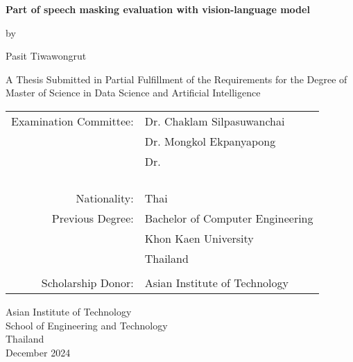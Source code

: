 \begin{titlepage}
  \begin{center}
   
  \textbf{\large{ Part of speech masking evaluation with vision-language model }}

  \vspace{3em} %
  
  by
  
  \vspace{3em} %
  
  Pasit Tiwawongrut
  
  \vspace{4em} %

  A Thesis Submitted in Partial Fulfillment of the Requirements for the Degree of Master of Science in Data Science and Artificial Intelligence

  \vspace{4em} %

\begin{center}
  \begin{tabular}{ rl }
Examination Committee: & Dr. Chaklam Silpasuwanchai \\
                       & Dr. Mongkol Ekpanyapong \\
                       & Dr.  \\\\
                       
\\ \\ \\
Nationality:     & Thai \\
Previous Degree: & Bachelor of Computer Engineering \\
                 & Khon Kaen University \\
                 & Thailand \\
\\
Scholarship Donor: & Asian Institute of Technology
  \end{tabular}
\end{center}

\vspace{3em}

Asian Institute of Technology \\
School of Engineering and Technology \\
Thailand \\           
December 2024


  \end{center}
\end{titlepage}
